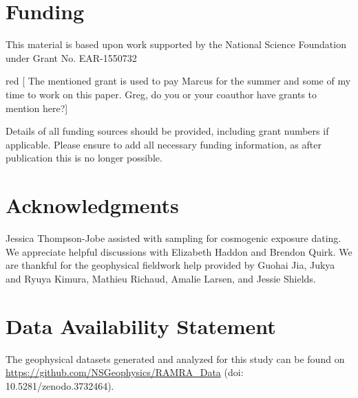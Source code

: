 \documentclass[utf8]{frontiersSCNS}
\newcommand{\alon}{\begin{color}{red}}
\newcommand{\aloff}{\end{color}}
\begin{document}
\section*{Funding}
This material is based upon work supported by the National Science Foundation under Grant No. EAR-1550732

\alon 
[ The mentioned grant is used to pay Marcus for the summer and some of my time to work on this paper. Greg, do you or your coauthor have grants to mention here?]

Details of all funding sources should be provided, including grant numbers if applicable. Please ensure to add all necessary funding information, as after publication this is no longer possible.
\aloff

\section*{Acknowledgments}

Jessica Thompson-Jobe assisted with sampling for cosmogenic exposure dating.  We appreciate helpful discussions with Elizabeth Haddon and Brendon Quirk. We are thankful for the geophysical fieldwork help provided by Guohai Jia, Jukya and Ryuya Kimura, Mathieu Richaud, Amalie Larsen, and Jessie Shields. 




\section*{Data Availability Statement}
The geophysical datasets generated and analyzed for this study can be found on \url{https://github.com/NSGeophysics/RAMRA_Data} (doi: 10.5281/zenodo.3732464).




\end{document}
